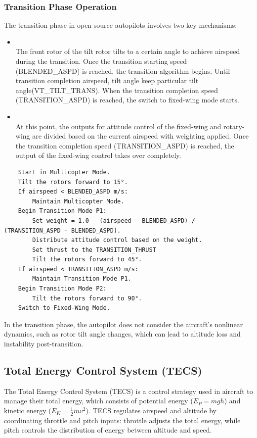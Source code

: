 \documentclass[journal,article,submit,pdftex,moreauthors]{Definitions/mdpi}
\begin{document}
\subsubsection{Transition Phase Operation}
The transition phase in open-source autopilots involves two key mechanisms:
\begin{itemize}
    \item {} \\
    The front rotor of the tilt rotor tilts to a certain angle to achieve airspeed during the transition. Once the transition starting speed (BLENDED\_ASPD) is reached, the transition algorithm begins. Until transition completion airspeed, tilt angle keep particular tilt angle(VT\_TILT\_TRANS). When the transition completion speed (TRANSITION\_ASPD) is reached, the switch to fixed-wing mode starts.
    \item {} \\
    At this point, the outputs for attitude control of the fixed-wing and rotary-wing are divided based on the current airspeed with weighting applied. Once the transition completion speed (TRANSITION\_ASPD) is reached, the output of the fixed-wing control takes over completely.
\end{itemize}

\begin{verbatim}
    Start in Multicopter Mode.
    Tilt the rotors forward to 15°.
    If airspeed < BLENDED_ASPD m/s:
        Maintain Multicopter Mode.
    Begin Transition Mode P1:
        Set weight = 1.0 - (airspeed - BLENDED_ASPD) / (TRANSITION_ASPD - BLENDED_ASPD).
        Distribute attitude control based on the weight.
        Set thrust to the TRANSITION_THRUST
        Tilt the rotors forward to 45°.
    If airspeed < TRANSITION_ASPD m/s:
        Maintain Transition Mode P1.
    Begin Transition Mode P2:
        Tilt the rotors forward to 90°.
    Switch to Fixed-Wing Mode.
\end{verbatim}

In the transition phase, the autopilot does not consider the aircraft's nonlinear dynamics, such as rotor tilt angle changes, which can lead to altitude loss and instability post-transition.

\subsection{Total Energy Control System (TECS)}
The Total Energy Control System (TECS) is a control strategy used in aircraft to manage their total energy, which consists of potential energy (\(E_P = mgh\)) and kinetic energy (\(E_K = \frac{1}{2}mv^2\)). TECS regulates airspeed and altitude by coordinating throttle and pitch inputs: throttle adjusts the total energy, while pitch controls the distribution of energy between altitude and speed.
\end{document}
